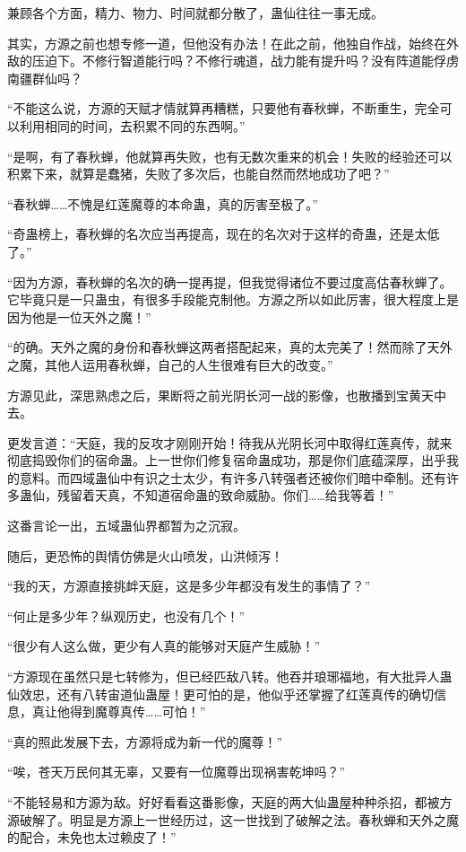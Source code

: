 \begin{this_body}
兼顾各个方面，精力、物力、时间就都分散了，蛊仙往往一事无成。

其实，方源之前也想专修一道，但他没有办法！在此之前，他独自作战，始终在外敌的压迫下。不修行智道能行吗？不修行魂道，战力能有提升吗？没有阵道能俘虏南疆群仙吗？

“不能这么说，方源的天赋才情就算再糟糕，只要他有春秋蝉，不断重生，完全可以利用相同的时间，去积累不同的东西啊。”

“是啊，有了春秋蝉，他就算再失败，也有无数次重来的机会！失败的经验还可以积累下来，就算是蠢猪，失败了多次后，也能自然而然地成功了吧？”

“春秋蝉……不愧是红莲魔尊的本命蛊，真的厉害至极了。”

“奇蛊榜上，春秋蝉的名次应当再提高，现在的名次对于这样的奇蛊，还是太低了。”

“因为方源，春秋蝉的名次的确一提再提，但我觉得诸位不要过度高估春秋蝉了。它毕竟只是一只蛊虫，有很多手段能克制他。方源之所以如此厉害，很大程度上是因为他是一位天外之魔！”

“的确。天外之魔的身份和春秋蝉这两者搭配起来，真的太完美了！然而除了天外之魔，其他人运用春秋蝉，自己的人生很难有巨大的改变。”

方源见此，深思熟虑之后，果断将之前光阴长河一战的影像，也散播到宝黄天中去。

更发言道：“天庭，我的反攻才刚刚开始！待我从光阴长河中取得红莲真传，就来彻底捣毁你们的宿命蛊。上一世你们修复宿命蛊成功，那是你们底蕴深厚，出乎我的意料。而四域蛊仙中有识之士太少，有许多八转强者还被你们暗中牵制。还有许多蛊仙，残留着天真，不知道宿命蛊的致命威胁。你们……给我等着！”

这番言论一出，五域蛊仙界都暂为之沉寂。

随后，更恐怖的舆情仿佛是火山喷发，山洪倾泻！

“我的天，方源直接挑衅天庭，这是多少年都没有发生的事情了？”

“何止是多少年？纵观历史，也没有几个！”

“很少有人这么做，更少有人真的能够对天庭产生威胁！”

“方源现在虽然只是七转修为，但已经匹敌八转。他吞并琅琊福地，有大批异人蛊仙效忠，还有八转宙道仙蛊屋！更可怕的是，他似乎还掌握了红莲真传的确切信息，真让他得到魔尊真传……可怕！”

“真的照此发展下去，方源将成为新一代的魔尊！”

“唉，苍天万民何其无辜，又要有一位魔尊出现祸害乾坤吗？”

“不能轻易和方源为敌。好好看看这番影像，天庭的两大仙蛊屋种种杀招，都被方源破解了。明显是方源上一世经历过，这一世找到了破解之法。春秋蝉和天外之魔的配合，未免也太过赖皮了！”


\end{this_body}
